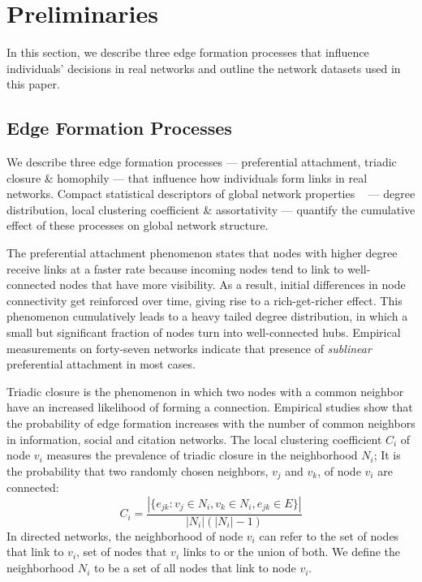 
\section{Preliminaries}
\label{sec:Preliminaries}

In this section, we describe three edge formation processes that influence
individuals' decisions in real networks and outline the network datasets used in this paper.


\subsection{Edge Formation Processes} \label{sub:Structural Properties}
We describe three edge formation processes --- preferential attachment,
triadic closure \& homophily --- that influence how individuals form links in real
networks. Compact statistical descriptors of global network properties ~\cite{newman2010networks}
--- degree distribution, local clustering coefficient \& assortativity --- quantify the cumulative effect
of these processes on global network structure.


The preferential attachment phenomenon \cite{simon1955class,
barabasi1999emergence} states that nodes with higher degree receive links at a
faster rate because incoming nodes tend to link to well-connected nodes that
have more visibility. As a result, initial
differences in node connectivity get reinforced over time, giving rise to a
rich-get-richer effect. This phenomenon cumulatively leads to a heavy tailed
degree distribution, in which a small but significant fraction of nodes turn
into well-connected hubs. Empirical measurements on forty-seven networks
\cite{kunegis2013preferential} indicate that presence of \textit{sublinear}
preferential attachment in most cases.


Triadic closure \cite{simmel1950sociology, newman2001clustering} is the phenomenon in which two nodes with a
common neighbor have an increased likelihood of forming a connection.
Empirical studies \cite{kossinets2006empirical} show that the probability of edge formation
increases with the number of common neighbors in information, social and citation networks. The local clustering coefficient
$C_i$ of node $v_i$ measures the prevalence of triadic closure in the
neighborhood $N_i$; It is the probability that two randomly chosen neighbors, $v_j$ and $v_k$,
of node $v_i$ are connected:
$$ C_i = \frac{|\{e_{jk} : v_j \in N_i, v_k \in N_i, e_{jk} \in E\}|}{|N_i|(|N_i|-1)}$$
In directed networks, the neighborhood of node $v_i$ can refer to the set of
nodes that link to $v_i$, set of nodes that $v_i$ links to or the union of
both. We define the neighborhood $N_i$ to be a set of all nodes that link to
node $v_i$.

